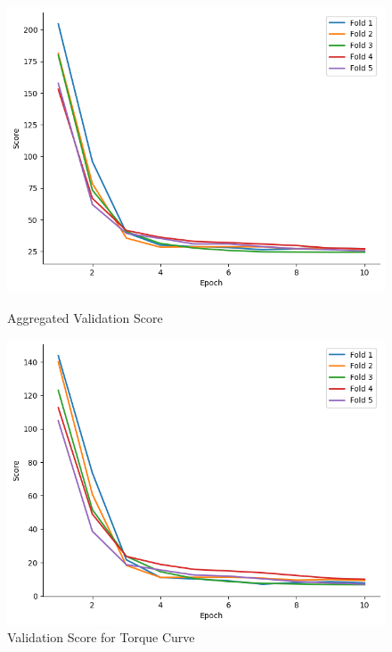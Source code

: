\documentclass{report} %
\begin{document}
\begin{figure}[H]
    \centering
    \begin{minipage}[b]{0.3\textwidth}
        \includegraphics[width=\textwidth]{./ReportImages/val_score.png}
        \caption{Aggregated Validation Score}
        \label{fig:Aggregated Validation Score}
    \end{minipage}
    \begin{minipage}[b]{0.3\textwidth}
        \includegraphics[width=\textwidth]{./ReportImages/val_score_y1.png}
        \caption{Validation Score for Torque Curve}
        \label{fig:Validation Score for Torque Curve}
    \end{minipage}
    \hfill
    \begin{minipage}[b]{0.3\textwidth}

\end{minipage}
\end{figure}
\end{document}
